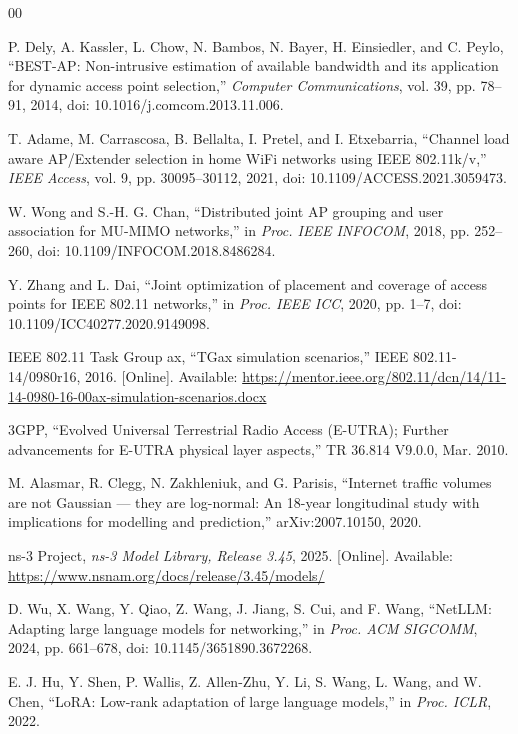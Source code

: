 \documentclass[conference]{IEEEtran}
\begin{document}
\begin{thebibliography}{00}

P. Dely, A. Kassler, L. Chow, N. Bambos, N. Bayer, H. Einsiedler, and
C. Peylo, ``BEST-AP: Non-intrusive estimation of available bandwidth and its
application for dynamic access point selection,'' \emph{Computer
Communications}, vol. 39, pp. 78--91, 2014,
doi: 10.1016/j.comcom.2013.11.006.

T. Adame, M. Carrascosa, B. Bellalta, I. Pretel, and I. Etxebarria, ``Channel
load aware AP/Extender selection in home WiFi networks using IEEE
802.11k/v,'' \emph{IEEE Access}, vol. 9, pp. 30095--30112, 2021,
doi: 10.1109/ACCESS.2021.3059473.

W. Wong and S.-H. G. Chan, ``Distributed joint AP grouping and user
association for MU-MIMO networks,'' in \emph{Proc. IEEE INFOCOM}, 2018,
pp. 252--260, doi: 10.1109/INFOCOM.2018.8486284.

Y. Zhang and L. Dai, ``Joint optimization of placement and coverage of access
points for IEEE 802.11 networks,'' in \emph{Proc. IEEE ICC}, 2020,
pp. 1--7, doi: 10.1109/ICC40277.2020.9149098.

IEEE 802.11 Task Group ax, ``TGax simulation scenarios,'' IEEE
802.11-14/0980r16, 2016. [Online]. Available:
\url{https://mentor.ieee.org/802.11/dcn/14/11-14-0980-16-00ax-simulation-scenarios.docx}

3GPP, ``Evolved Universal Terrestrial Radio Access (E-UTRA); Further
advancements for E-UTRA physical layer aspects,'' TR 36.814 V9.0.0, Mar. 2010.

M. Alasmar, R. Clegg, N. Zakhleniuk, and G. Parisis, ``Internet traffic
volumes are not Gaussian --- they are log-normal: An
18-year longitudinal study with implications for modelling and prediction,''
arXiv:2007.10150, 2020.

ns-3 Project, \emph{ns-3 Model Library, Release 3.45}, 2025. [Online].
Available: \url{https://www.nsnam.org/docs/release/3.45/models/}

D. Wu, X. Wang, Y. Qiao, Z. Wang, J. Jiang, S. Cui, and F. Wang, ``NetLLM:
Adapting large language models for networking,'' in \emph{Proc. ACM SIGCOMM},
2024, pp. 661--678, doi: 10.1145/3651890.3672268.

E. J. Hu, Y. Shen, P. Wallis, Z. Allen-Zhu, Y. Li, S. Wang, L. Wang, and
W. Chen, ``LoRA: Low-rank adaptation of large language models,'' in
\emph{Proc. ICLR}, 2022.


\end{thebibliography}
\end{document}
